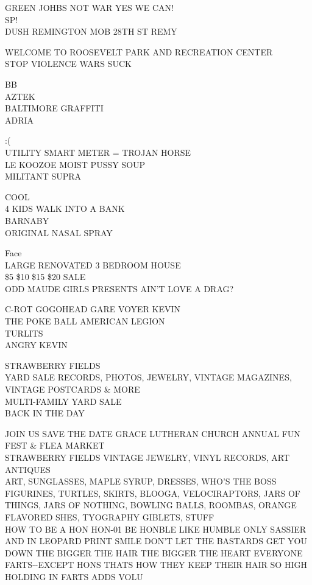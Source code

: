 \documentclass[10pt,letterpaper]{article}
\begin{document}
GREEN JOHBS NOT WAR YES WE CAN!\\
SP!\\
DUSH REMINGTON MOB 28TH ST REMY

WELCOME TO ROOSEVELT PARK AND RECREATION CENTER\\
STOP VIOLENCE WARS SUCK

BB\\
AZTEK\\
BALTIMORE GRAFFITI\\
ADRIA

:(\\
UTILITY SMART METER = TROJAN HORSE\\
LE KOOZOE MOIST PUSSY SOUP\\
MILITANT SUPRA

COOL\\
4 KIDS WALK INTO A BANK\\
BARNABY\\
ORIGINAL NASAL SPRAY

Face\\
LARGE RENOVATED 3 BEDROOM HOUSE\\
\$5 \$10 \$15 \$20 SALE\\
ODD MAUDE GIRLS PRESENTS AIN'T LOVE A DRAG?

C{-}ROT GOGOHEAD GARE VOYER KEVIN\\
THE POKE BALL AMERICAN LEGION\\
TURLITS\\
ANGRY KEVIN

STRAWBERRY FIELDS\\
YARD SALE RECORDS, PHOTOS, JEWELRY, VINTAGE MAGAZINES, VINTAGE POSTCARDS \& MORE\\
MULTI{-}FAMILY YARD SALE\\
BACK IN THE DAY

JOIN US SAVE THE DATE GRACE LUTHERAN CHURCH ANNUAL FUN FEST \& FLEA MARKET\\
STRAWBERRY FIELDS VINTAGE JEWELRY, VINYL RECORDS, ART ANTIQUES\\
ART, SUNGLASSES, MAPLE SYRUP, DRESSES, WHO'S THE BOSS FIGURINES, TURTLES, SKIRTS, BLOOGA, VELOCIRAPTORS, JARS OF THINGS, JARS OF NOTHING, BOWLING BALLS, ROOMBAS, ORANGE FLAVORED SHES, TYOGRAPHY GIBLETS, STUFF\\
HOW TO BE A HON HON{-}01 BE HONBLE LIKE HUMBLE ONLY SASSIER AND IN LEOPARD PRINT SMILE DON'T LET THE BASTARDS GET YOU DOWN THE BIGGER THE HAIR THE BIGGER THE HEART EVERYONE FARTS{-}{-}EXCEPT HONS THATS HOW THEY KEEP THEIR HAIR SO HIGH HOLDING IN FARTS ADDS VOLU
\end{document}
